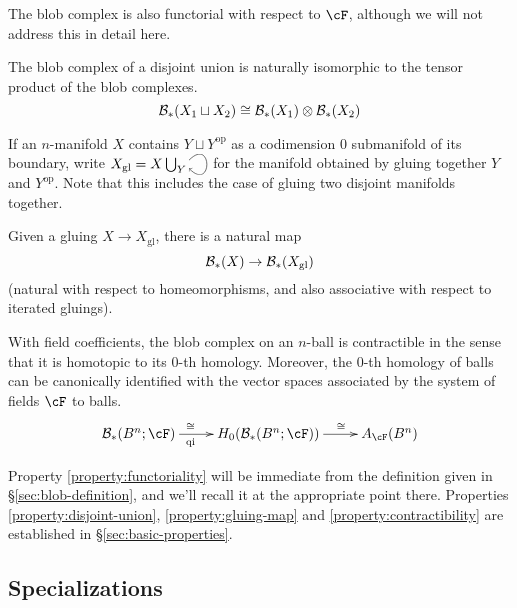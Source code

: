 The blob complex is also functorial with respect to $\cF$, 
although we will not address this in detail here.

\begin{property}
\label{property:disjoint-union}
The blob complex of a disjoint union is naturally isomorphic to the tensor product of the blob complexes.
\begin{equation*}
{\mathcal B}_*(X_1 \sqcup X_2) \cong {\mathcal B}_*(X_1) \otimes {\mathcal B}_*(X_2)
\end{equation*}
\end{property}

If an $n$-manifold $X$ contains $Y \sqcup Y^\text{op}$ as a codimension $0$ submanifold of its boundary, 
write $X_\text{gl} = X \bigcup_{Y}\selfarrow$ for the manifold obtained by gluing together $Y$ and $Y^\text{op}$.
Note that this includes the case of gluing two disjoint manifolds together.
\begin{property}
\label{property:gluing-map}%
Given a gluing $X \to X_\mathrm{gl}$, there is
a natural map
\[
	{\mathcal B}_*(X) \to {\mathcal B}_*(X_\mathrm{gl}) 
\]
(natural with respect to homeomorphisms, and also associative with respect to iterated gluings).
\end{property}

\begin{property}[Contractibility]
\label{property:contractibility}%
With field coefficients, the blob complex on an $n$-ball is contractible in the sense 
that it is homotopic to its $0$-th homology.
Moreover, the $0$-th homology of balls can be canonically identified with the vector spaces 
associated by the system of fields $\cF$ to balls.
\begin{equation*}
\xymatrix{\bc_*(B^n;\cF) \ar[r]^(0.4){\iso}_(0.4){\text{qi}} & H_0(\bc_*(B^n;\cF)) \ar[r]^(0.6)\iso & A_\cF(B^n)}
\end{equation*}
\end{property}

Property \ref{property:functoriality} will be immediate from the definition given in
\S \ref{sec:blob-definition}, and we'll recall it at the appropriate point there.
Properties \ref{property:disjoint-union}, \ref{property:gluing-map} and 
\ref{property:contractibility} are established in \S \ref{sec:basic-properties}.

\subsection{Specializations}
\label{sec:specializations}


